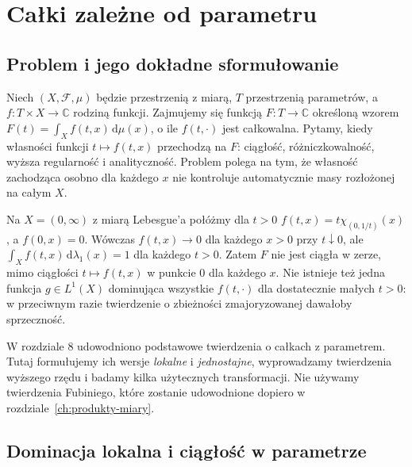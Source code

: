 \chapter{Całki zależne od parametru}
\label{ch:parametry-calki}

\providecommand{\atlasref}[2]{#2}


\section{Problem i jego dokładne sformułowanie}

Niech $(X,\mathcal F,\mu)$ będzie przestrzenią z miarą, $T$ przestrzenią
parametrów, a $f:T\times X\to\mathbb C$ rodziną funkcji. Zajmujemy się
funkcją $F:T\to\mathbb C$ określoną wzorem
$F(t)=\int_X f(t,x)\,\mathrm d\mu(x)$, o ile $f(t,\cdot)$ jest całkowalna.
Pytamy, kiedy własności funkcji $t\mapsto f(t,x)$ przechodzą na $F$:
ciągłość, różniczkowalność, wyższa regularność i analityczność. Problem
polega na tym, że własność zachodząca osobno dla każdego $x$ nie
kontroluje automatycznie masy rozłożonej na całym $X$.

\begin{przyklad}
\label{ex:params-escape-11}
Na $X=(0,\infty)$ z miarą Lebesgue'a połóżmy dla $t>0$
$f(t,x)=t\chi_{(0,1/t)}(x)$, a $f(0,x)=0$.
Wówczas $f(t,x)\to0$ dla każdego $x>0$ przy $t\downarrow0$,
ale $\int_X f(t,x)\,\mathrm d\lambda_1(x)=1$ dla każdego $t>0$.
Zatem $F$ nie jest ciągła w zerze, mimo ciągłości $t\mapsto f(t,x)$
w punkcie $0$ dla każdego $x$. Nie istnieje też jedna funkcja
$g\in L^1(X)$ dominująca wszystkie $f(t,\cdot)$ dla dostatecznie
małych $t>0$: w przeciwnym razie twierdzenie o zbieżności
zmajoryzowanej dawałoby sprzeczność.
\end{przyklad}

\begin{uwaga}
W rozdziale 8 udowodniono podstawowe twierdzenia o całkach z parametrem.
Tutaj formułujemy ich wersje \emph{lokalne} i \emph{jednostajne},
wyprowadzamy twierdzenia wyższego rzędu i badamy kilka użytecznych
transformacji. Nie używamy twierdzenia Fubiniego, które zostanie
udowodnione dopiero w rozdziale~\ref{ch:produkty-miary}.
\end{uwaga}

\section{Dominacja lokalna i ciągłość w parametrze}

